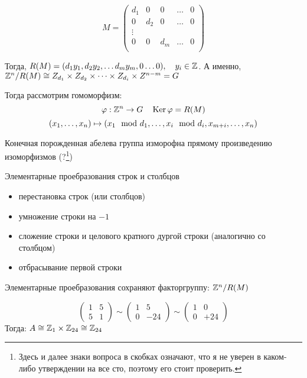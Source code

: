 \begin{proposition}
  \[M = 
  \begin{pmatrix}
    d_1 & 0 & 0 & \dots & 0 \\
    0 & d_2 & 0 & \dots & 0 \\
    \vdots \\
    0 & 0 & d_m & \dots & 0 \\
  \end{pmatrix}
  \]

\end{proposition}
Тогда, $R(M) = (d_1 y_1, d_2 y_2, \dots d_m y_m, 0 \dots 0), \quad y_i \in \mathbb{Z}$.
А именно, $\mathbb{Z}^n / R(M) \cong Z_{d_1} \times Z_{d_2} \times \dots \times Z_{d_i} \times Z^{n - m} = G$
\begin{example}
  Тогда рассмотрим гомоморфизм:
  \[\varphi : \mathbb{Z}^n \rightarrow G \quad \operatorname{Ker} \varphi = R(M)\]
  \[(x_1, \dots, x_n) \mapsto (x_1 \mod d_1, \dots, x_i \mod d_i, x_{m+i}, \dots, x_n)\]

\end{example}

\begin{theorem}
  Конечная порожденная абелева группа изморофна прямому произведению изоморфизмов (?\footnote{Здесь и далее знаки вопроса в скобках означают, что я не уверен в каком-либо утверждении на все сто, поэтому его стоит проверить.})
\end{theorem}

\begin{corollary}
  Элементарные проебразования строк и столбцов 
  \begin{itemize}
    \item перестановка строк (или столбцов)
    \item умножение строки на $-1$ 
    \item сложение строки и целового кратного дургой строки (аналогично со столбцом)
    \item отбрасывание первой строки
  \end{itemize}
\end{corollary}

\begin{lemma}
  Элементарные проебразования сохраняют факторгруппу: $\mathbb{Z}^n / R(M)$
\end{lemma}

\begin{example}
  \[
  \begin{pmatrix}
    1 & 5 \\
    5 & 1
  \end{pmatrix}
  \sim
  \begin{pmatrix}
    1 & 5 \\
    0 & -24
  \end{pmatrix}
  \sim
  \begin{pmatrix}
    1 & 0 \\
    0 & +24
  \end{pmatrix}
  \]
  Тогда: $A \cong \mathbb{Z}_1 \times \mathbb{Z}_{24} \cong \mathbb{Z}_{24}$
\end{example}

